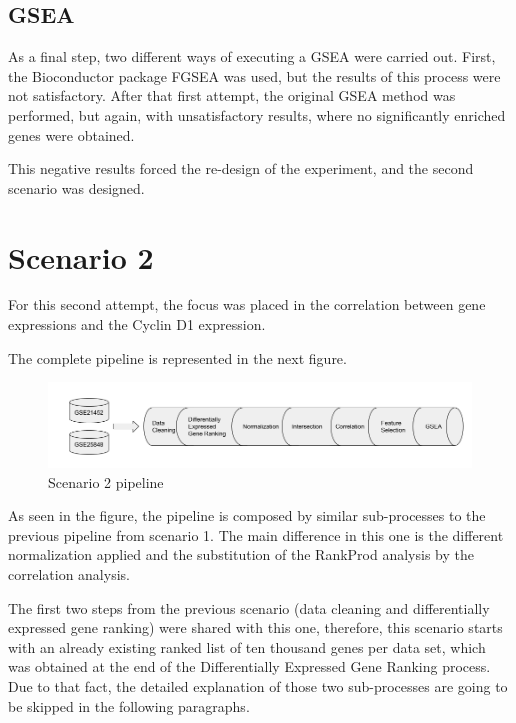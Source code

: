 \subsection{GSEA}
As a final step, two different ways of executing a GSEA were carried out.
First, the Bioconductor package FGSEA\cite{fgsea} was used, but the results of this process were not satisfactory.
After that first attempt, the original GSEA method\cite{Subramanian15545} was performed, but again, with unsatisfactory results, where no significantly enriched genes were obtained.

This negative results forced the re-design of the experiment, and the second scenario was designed.

\newpage
\section{Scenario 2}

For this second attempt, the focus was placed in the correlation between gene expressions and the Cyclin D1 expression.

The complete pipeline is represented in the next figure.

\begin{figure}[h]
    \centering
    \includegraphics[scale=0.5]{../figs/scenario_2_figure.png}
    \caption{Scenario 2 pipeline}
    \label{fig:scenario-2}
\end{figure}

As seen in the figure, the pipeline is composed by similar sub-processes to the previous pipeline from scenario 1. The main difference in this one is the different normalization applied and the substitution of the RankProd analysis by the correlation analysis.

The first two steps from the previous scenario (data cleaning and differentially expressed gene ranking) were shared with this one, therefore, this scenario starts with an already existing ranked list of ten thousand genes per data set, which was obtained at the end of the Differentially Expressed Gene Ranking process. Due to that fact, the detailed explanation of those two sub-processes are going to be skipped in the following paragraphs.



